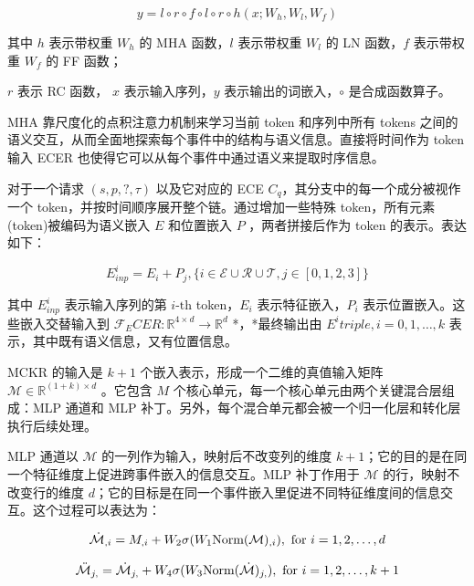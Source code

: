 \documentclass[a4paper, AutoFakeBold]{article}
\begin{document}
\begin{equation}
y=l\circ r\circ f\circ l\circ r \circ h(x;W_h,W_l,W_f)
\end{equation}

其中 $h$ 表示带权重 $W_h$ 的 MHA 函数，$l$ 表示带权重 $W_l$ 的 LN 函数，$f$ 表示带权重 $W_f$ 的 FF 函数；

$r$ 表示 RC 函数， $x$ 表示输入序列，$y$ 表示输出的词嵌入，$\circ$ 是合成函数算子。

MHA 靠尺度化的点积注意力机制来学习当前 token 和序列中所有 tokens 之间的语义交互，从而全面地探索每个事件中的结构与语义信息。直接将时间作为 token 输入 ECER 也使得它可以从每个事件中通过语义来提取时序信息。

对于一个请求 $(s,p,?,\tau)$ 以及它对应的 ECE $C_q$，其分支中的每一个成分被视作一个 token，并按时间顺序展开整个链。通过增加一些特殊 token，所有元素(token)被编码为语义嵌入 $E$ 和位置嵌入 $P$ ，两者拼接后作为 token 的表示。表达如下：

\begin{equation}
E^i_{inp}=E_i+P_j,\{i\in{\mathcal E}\cup{\mathcal R}\cup{\mathcal T},j\in[0,1,2,3]\}
\end{equation}

其中 $E^i_{inp}$ 表示输入序列的第 $i\text{-th}$ token，$E_i$ 表示特征嵌入，$P_i$ 表示位置嵌入。这些嵌入交替输入到 ${\mathcal F}_ECER:{\mathbb R}^{4\times d}\rightarrow {\mathbb R}^d$ *，*最终输出由 $E^i{triple},i=0,1,\dots,k$ 表示，其中既有语义信息，又有位置信息。


MCKR 的输入是 $k+1$ 个嵌入表示，形成一个二维的真值输入矩阵 ${\mathcal M}\in{\mathbb R}^{(1+k)\times d}$ 。它包含 $M$ 个核心单元，每一个核心单元由两个关键混合层组成：MLP 通道和 MLP 补丁。另外，每个混合单元都会被一个归一化层和转化层执行后续处理。

MLP 通道以 ${\mathcal M}$ 的一列作为输入，映射后不改变列的维度 $k+1$；它的目的是在同一个特征维度上促进跨事件嵌入的信息交互。MLP 补丁作用于 ${\mathcal M}$ 的行，映射不改变行的维度 $d$；它的目标是在同一个事件嵌入里促进不同特征维度间的信息交互。这个过程可以表达为：

\begin{equation}
\dot{\mathcal M}_{\*,i}=M_{\*,i}+W_2\sigma(W_1\text{Norm}({\mathcal M})_{\*,i}),\ \text{for}\ i=1,2,\dots,d
\end{equation}

\begin{equation}
\ddot{\mathcal M}_{j,\*}=\dot{\mathcal M}_{j,\*}+W_4\sigma(W_3\text{Norm}(\dot{\mathcal M})_{j,\*}),\ \text{for}\ i=1,2,\dots,k+1
\end{equation}
\end{document}
